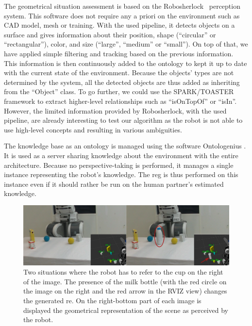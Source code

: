 The geometrical situation assessment is based on the Robosherlock~\cite{beetz_2015_robosherlock} perception system. This software does not require any a priori on the environment such as CAD model, mesh or training. With the used pipeline, it detects objects on a surface and gives information about their position, shape (``circular'' or ``rectangular''), color, and size (``large'', ``medium'' or ``small''). On top of that, we have applied simple filtering and tracking based on the previous information. This information is then continuously added to the ontology to kept it up to date with the current state of the environment. Because the objects' types are not determined by the system, all the detected objects are thus added as inheriting from the ``Object'' class. To go further, we could use the SPARK/TOASTER~\cite{milliez_2014_framework} framework to extract higher-level relationships such as ``isOnTopOf'' or ``isIn''. However, the limited information provided by Robosherlock, with the used pipeline, are already interesting to test our algorithm as the robot is not able to use high-level concepts and resulting in various ambiguities.

The knowledge base as an ontology is managed using the software Ontologenius \cite{sarthou_2019_ontologenius}. It is used as a server sharing knowledge about the environment with the entire architecture. Because no perspective-taking is performed, it manages a single instance representing the robot's knowledge. The \acrshort{reg} is thus performed on this instance even if it should rather be run on the human partner's estimated knowledge.

\begin{figure}[b!]
\centering
\includegraphics[width=\textwidth]{figures/chapter4/pr2.png}
\caption{\label{fig:chap4_pr2} Two situations where the robot has to refer to the cup on the right of the image. The presence of the milk bottle (with the red circle on the image on the right and the red arrow in the RVIZ view) changes the generated \acrshort{re}. On the right-bottom part of each image is displayed the geometrical representation of the scene as perceived by the robot.}
\end{figure}

